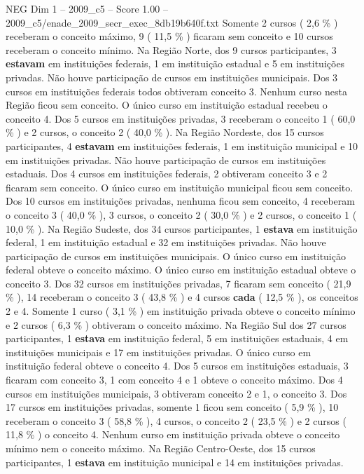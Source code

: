 \begin{textsample}{NEG Dim 1 – 2009\_c5 – Score 1.00 – 2009\_c5/enade\_2009\_secr\_exec\_8db19b640f.txt}
Somente 2 cursos ( 2,6 \% ) receberam o conceito máximo, 9 ( 11,5 \% ) ficaram sem conceito e 10 cursos receberam o conceito mínimo.
Na Região Norte, dos 9 cursos participantes, 3 \textbf{estavam} em instituições federais, 1 em instituição estadual e 5 em instituições privadas.
Não houve participação de cursos em instituições municipais.
Dos 3 cursos em instituições federais todos obtiveram conceito 3.
Nenhum curso nesta Região ficou sem conceito.
O único curso em instituição estadual recebeu o conceito 4.
Dos 5 cursos em instituições privadas, 3 receberam o conceito 1 ( 60,0 \% ) e 2 cursos, o conceito 2 ( 40,0 \% ).
Na Região Nordeste, dos 15 cursos participantes, 4 \textbf{estavam} em instituições federais, 1 em instituição municipal e 10 em instituições privadas.
Não houve participação de cursos em instituições estaduais.
Dos 4 cursos em instituições federais, 2 obtiveram conceito 3 e 2 ficaram sem conceito.
O único curso em instituição municipal ficou sem conceito.
Dos 10 cursos em instituições privadas, nenhuma ficou sem conceito, 4 receberam o conceito 3 ( 40,0 \% ), 3 cursos, o conceito 2 ( 30,0 \% ) e 2 cursos, o conceito 1 ( 10,0 \% ).
Na Região Sudeste, dos 34 cursos participantes, 1 \textbf{estava} em instituição federal, 1 em instituição estadual e 32 em instituições privadas.
Não houve participação de cursos em instituições municipais.
O único curso em instituição federal obteve o conceito máximo.
O único curso em instituição estadual obteve o conceito 3.
Dos 32 cursos em instituições privadas, 7 ficaram sem conceito ( 21,9 \% ), 14 receberam o conceito 3 ( 43,8 \% ) e 4 cursos \textbf{cada} ( 12,5 \% ), os conceitos 2 e 4.
Somente 1 curso ( 3,1 \% ) em instituição privada obteve o conceito mínimo e 2 cursos ( 6,3 \% ) obtiveram o conceito máximo.
Na Região Sul dos 27 cursos participantes, 1 \textbf{estava} em instituição federal, 5 em instituições estaduais, 4 em instituições municipais e 17 em instituições privadas.
O único curso em instituição federal obteve o conceito 4.
Dos 5 cursos em instituições estaduais, 3 ficaram com conceito 3, 1 com conceito 4 e 1 obteve o conceito máximo.
Dos 4 cursos em instituições municipais, 3 obtiveram conceito 2 e 1, o conceito 3.
Dos 17 cursos em instituições privadas, somente 1 ficou sem conceito ( 5,9 \% ), 10 receberam o conceito 3 ( 58,8 \% ), 4 cursos, o conceito 2 ( 23,5 \% ) e 2 cursos ( 11,8 \% ) o conceito 4.
Nenhum curso em instituição privada obteve o conceito mínimo nem o conceito máximo.
Na Região Centro-Oeste, dos 15 cursos participantes, 1 \textbf{estava} em instituição municipal e 14 em instituições privadas.

\end{textsample}
